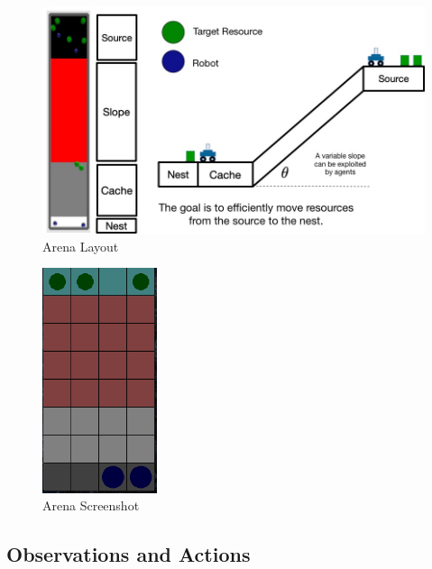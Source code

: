 \documentclass[12pt]{article}
\begin{document}
\begin{appendices}
\begin{figure}
	\centering
	\includegraphics[width=\textwidth]{arena.jpg}
	\caption{Arena Layout}
	\label{fig:arena}
\end{figure}

\begin{figure}
	\centering
	\includegraphics[width=0.3\textwidth]{arena_layout.png}
	\caption{Arena Screenshot}
	\label{fig:arena_2}
\end{figure}

\subsection{Observations and Actions}\label{observation_space}


\end{appendices}
\end{document}
